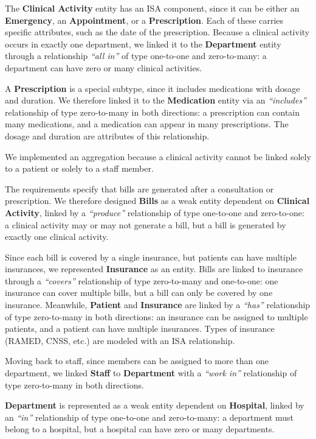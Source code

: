 \documentclass[a4paper,12pt]{article}
\begin{document}
The \textbf{Clinical Activity} entity has an ISA component, since it can be either an \textbf{Emergency}, an \textbf{Appointment}, or a \textbf{Prescription}. Each of these carries specific attributes, such as the date of the prescription. Because a clinical activity occurs in exactly one department, we linked it to the \textbf{Department} entity through a relationship \textit{“all in”} of type one-to-one and zero-to-many: a department can have zero or many clinical activities.

A \textbf{Prescription} is a special subtype, since it includes medications with dosage and duration. We therefore linked it to the \textbf{Medication} entity via an \textit{“includes”} relationship of type zero-to-many in both directions: a prescription can contain many medications, and a medication can appear in many prescriptions. The dosage and duration are attributes of this relationship.

We implemented an aggregation because a clinical activity cannot be linked solely to a patient or solely to a staff member.

The requirements specify that bills are generated after a consultation or prescription. We therefore designed \textbf{Bills} as a weak entity dependent on \textbf{Clinical Activity}, linked by a \textit{“produce”} relationship of type one-to-one and zero-to-one: a clinical activity may or may not generate a bill, but a bill is generated by exactly one clinical activity.

Since each bill is covered by a single insurance, but patients can have multiple insurances, we represented \textbf{Insurance} as an entity. Bills are linked to insurance through a \textit{“covers”} relationship of type zero-to-many and one-to-one: one insurance can cover multiple bills, but a bill can only be covered by one insurance. Meanwhile, \textbf{Patient} and \textbf{Insurance} are linked by a \textit{“has”} relationship of type zero-to-many in both directions: an insurance can be assigned to multiple patients, and a patient can have multiple insurances. Types of insurance (RAMED, CNSS, etc.) are modeled with an ISA relationship.

Moving back to staff, since members can be assigned to more than one department, we linked \textbf{Staff} to \textbf{Department} with a \textit{“work in”} relationship of type zero-to-many in both directions.

\textbf{Department} is represented as a weak entity dependent on \textbf{Hospital}, linked by an \textit{“in”} relationship of type one-to-one and zero-to-many: a department must belong to a hospital, but a hospital can have zero or many departments.
\end{document}
